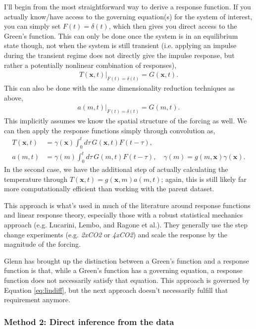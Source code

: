 I'll begin from the most straightforward way to derive a response function. If you actually know/have access to the governing equation(s) for the system of interest, you can simply set $F(t) = \delta(t)$, which then gives you direct access to the Green's function. This can only be done once the system is in an equilibrium state though, not when the system is still transient (i.e. applying an impulse during the transient regime does not directly give the impulse response, but rather a potentially nonlinear combination of responses),
\begin{align}
  T(\mathbf{x},t)|_{F(t) = \delta(t)} = G(\mathbf{x},t).
\end{align}
This can also be done with the same dimensionality reduction techniques as above,
\begin{align}
  a(m,t)|_{F(t) = \delta(t)} = G(m,t).
\end{align}
This implicitly assumes we know the spatial structure of the forcing as well. We can then apply the response functions simply through convolution as,
\begin{align}
  T(\mathbf{x},t) &= \gamma(\mathbf{x}) \int_0^t d\tau \, G(\mathbf{x},t) F(t - \tau), \\
  a(m,t) &= \gamma(m) \int_0^t d\tau \, G(m,t) F(t - \tau), \quad \gamma(m) = g(m, \mathbf{x}) \gamma(\mathbf{x}).
\end{align}
In the second case, we have the additional step of actually calculating the temperature through $T(\mathbf{x},t) = g(\mathbf{x},m)a(m,t)$; again, this is still likely far more computationally efficient than working with the parent dataset.

This approach is what's used in much of the literature around response functions and linear response theory, especially those with a robust statistical mechanics approach (e.g. Lucarini, Lembo, and Ragone et al.). They generally use the step change  experiments (e.g. \textit{2xCO2} or \textit{4xCO2}) and scale the response by the magnitude of the forcing.

Glenn has brought up the distinction between a Green's function and a response function is that, while a Green's function has a governing equation, a response function does not necessarily satisfy that equation. This approach is governed by Equation \ref{eq:lindiff}, but the next approach doesn't necessarily fulfill that requirement anymore.

\subsubsection{Method 2: Direct inference from the data}

